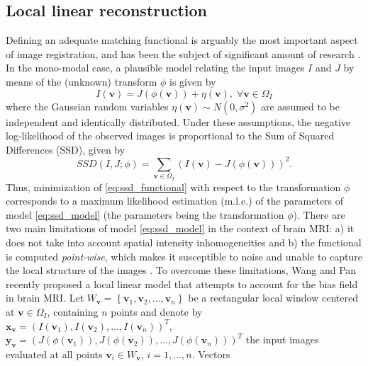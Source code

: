 \subsection{Local linear reconstruction}
Defining an adequate matching functional is arguably the most important aspect of image registration, and has been the subject of significant amount of research \cite{Sotiras2013}. In the mono-modal case, a plausible model relating the input images $I$ and $J$ by means of the (unknown) transform $\phi$ is given by
\begin{equation}\label{eq:ssd_model}
    I(\mathbf{v}) = J(\phi(\mathbf{v})) + \eta(\mathbf{v}), \; \forall \mathbf{v} \in\Omega_{I}
\end{equation}
where the Gaussian random variables $\eta(\mathbf{v}) \sim N(0, \sigma^{2})$ are assumed to be independent and identically distributed. Under these assumptions, the negative log-likelihood of the observed images is proportional to the Sum of Squared Differences (SSD), given by
\begin{equation}\label{eq:ssd_functional}
    SSD(I, J; \phi) = \sum_{\mathbf{v} \in \Omega_{I}} \left(I(\mathbf{v}) - J(\phi(\mathbf{v}))\right)^{2}.
\end{equation}
Thus, minimization of \eqref{eq:ssd_functional} with respect to the transformation $\phi$ corresponds to a maximum likelihood estimation (m.l.e.) of the parameters of model \eqref{eq:ssd_model} (the parameters being the transformation $\phi$). There are two main limitations of model \eqref{eq:ssd_model} in the context of brain MRI: a) it does not take into account spatial intensity inhomogeneities and b) the functional is computed \emph{point-wise}, which makes it susceptible to noise and unable to capture the local structure of the images \cite{Heinrich2012}. To overcome these limitations, Wang and Pan \cite{Wang2014} recently proposed a local linear model that attempts to account for the bias field in brain MRI. Let $W_{\mathbf{v}} = \left\lbrace \mathbf{v}_{1}, \mathbf{v}_{2}, ..., \mathbf{v}_{n} \right\rbrace$ be a rectangular local window centered at $\mathbf{v} \in\Omega_{I}$, containing $n$ points and denote by $\mathbf{x}_{\mathbf{v}} = (I(\mathbf{v}_{1}), I(\mathbf{v}_{2}), ..., I(\mathbf{v}_{n}))^{T}$, $\mathbf{y}_{\mathbf{v}} = (J(\phi(\mathbf{v}_{1})), J(\phi(\mathbf{v}_{2})), ..., J(\phi(\mathbf{v}_{n})))^{T}$ the input images evaluated at all points $\mathbf{v}_{i}\in W_{\mathbf{v}}$, $i=1, ..., n$. Vectors 

